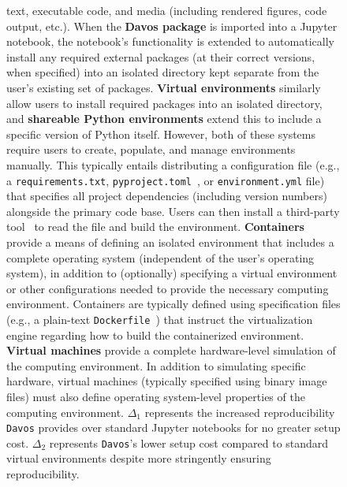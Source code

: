 \documentclass[preprint,12pt,a4paper]{elsarticle}
\begin{document}
\begin{figure}[tp]
{  text, executable code, and media (including rendered figures, code
  output, etc.). When the \textbf{Davos package} is imported
  into a Jupyter notebook, the notebook's functionality is extended to
  automatically install any required external packages (at their
  correct versions, when specified) into an isolated directory kept separate
  from the user's existing set of packages. \textbf{Virtual environments}
  similarly allow users to install required packages into an isolated
  directory, and \textbf{shareable Python environments} extend this to include
  a specific version of Python itself. However, both of these systems require
  users to create, populate, and manage environments manually. This
  typically entails distributing a configuration file (e.g., a
  \texttt{requirements.txt}, \texttt{pyproject.toml}~\cite{CannEtal16}, or
  \texttt{environment.yml} file) that specifies all project dependencies
  (including version numbers) alongside the primary code base. Users can then
  install a third-party tool~\cite[e.g.,][]{BickEtal07, Eust19, Anac12} to read
  the file and build the environment. \textbf{Containers} provide a means of
  defining an isolated environment that includes a complete operating
  system (independent of the user's operating system), in addition to
  (optionally) specifying a virtual environment or other
  configurations needed to provide the necessary computing
  environment. Containers are typically defined using
  specification files (e.g., a plain-text \texttt{Dockerfile}~\cite{Merk14}) that instruct the
  virtualization engine regarding how to build the containerized
  environment. \textbf{Virtual machines} provide a complete
  hardware-level simulation of the computing environment. In addition
  to simulating specific hardware, virtual machines (typically
  specified using binary image files) must also define operating
  system-level properties of the computing environment. $\Delta_1$
  represents the increased reproducibility \texttt{Davos} provides over standard
  Jupyter notebooks for no greater setup cost. $\Delta_2$ represents
  \texttt{Davos}'s lower setup cost compared to standard virtual environments
  despite more stringently ensuring reproducibility.}
\label{fig:code-sharing}
\end{figure}
\end{document}
